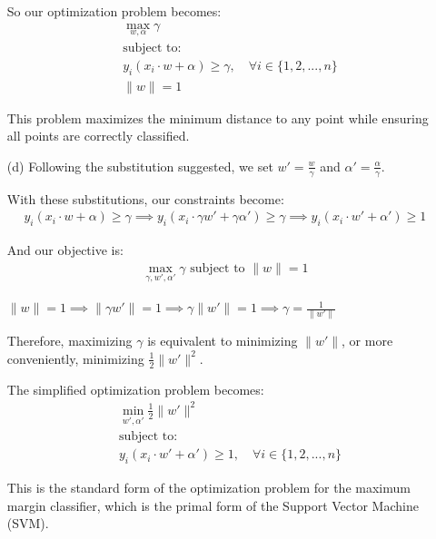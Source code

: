 \begin{itemize}
So our optimization problem becomes:
\begin{align*}
&\max_{w, \alpha} \gamma\\
&\text{subject to:}\\
&y_i(x_i \cdot w + \alpha) \geq \gamma, \quad \forall i \in \{1, 2, ..., n\}\\
&\|w\| = 1
\end{align*}

This problem maximizes the minimum distance to any point while ensuring all points are correctly classified.

\item[(d)] Following the substitution suggested, we set $w' = \frac{w}{\gamma}$ and $\alpha' = \frac{\alpha}{\gamma}$.

With these substitutions, our constraints become:
\begin{align*}
y_i(x_i \cdot w + \alpha) \geq \gamma \implies y_i(x_i \cdot \gamma w' + \gamma \alpha') \geq \gamma \implies y_i(x_i \cdot w' + \alpha') \geq 1
\end{align*}

And our objective is:
\begin{align*}
\max_{\gamma, w', \alpha'} \gamma \text{ subject to } \|w\| = 1
\end{align*}

$\|w\| = 1 \implies \|\gamma w'\| = 1 \implies \gamma \|w'\| = 1 \implies \gamma = \frac{1}{\|w'\|}$

Therefore, maximizing $\gamma$ is equivalent to minimizing $\|w'\|$, or more conveniently, minimizing $\frac{1}{2}\|w'\|^2$.

The simplified optimization problem becomes:
\begin{align*}
&\min_{w', \alpha'} \frac{1}{2}\|w'\|^2\\
&\text{subject to:}\\
&y_i(x_i \cdot w' + \alpha') \geq 1, \quad \forall i \in \{1, 2, ..., n\}
\end{align*}

This is the standard form of the optimization problem for the maximum margin classifier, which is the primal form of the Support Vector Machine (SVM).
\end{itemize}
\newpage